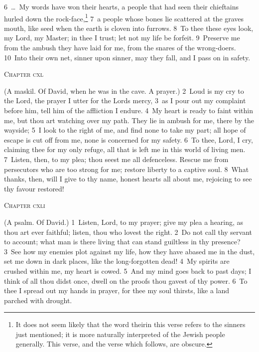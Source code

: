 \documentclass[10pt]{book} %
\begin{document}
\textcolor{benred8}{6}~\ldots\  My words have won their hearts, a people that had seen their chieftains hurled down the rock-face,\footnote[1]{It does not seem likely that the word \textasciigrave their\textquotesingle  in this verse refers to the sinners just mentioned; it is more naturally interpreted of the Jewish people generally. This verse, and the verse which follows, are obscure.} \textcolor{benred8}{7}~a people whose bones lie scattered at the grave\textquotesingle s mouth, like seed when the earth is cloven into furrows.
\textcolor{benred8}{8}~To thee these eyes look, my Lord, my Master; in thee I trust; let not my life be forfeit. \textcolor{benred8}{9}~Preserve me from the ambush they have laid for me, from the snares of the wrong-doers. \textcolor{benred8}{10}~Into their own net, sinner upon sinner, may they fall, and I pass on in safety.
\begin{large}\begin{center}\textsc{Chapter cxl}\end{center}\end{large}
(A maskil. Of David, when he was in the cave. A prayer.)
\textcolor{benred8}{2}~Loud is my cry to the Lord, the prayer I utter for the Lord\textquotesingle s mercy, \textcolor{benred8}{3}~as I pour out my complaint before him, tell him of the affliction I endure. \textcolor{benred8}{4}~My heart is ready to faint within me, but thou art watching over my path. They lie in ambush for me, there by the wayside; \textcolor{benred8}{5}~I look to the right of me, and find none to take my part; all hope of escape is cut off from me, none is concerned for my safety. \textcolor{benred8}{6}~To thee, Lord, I cry, claiming thee for my only refuge, all that is left me in this world of living men. \textcolor{benred8}{7}~Listen, then, to my plea; thou seest me all defenceless. Rescue me from persecutors who are too strong for me; restore liberty to a captive soul. \textcolor{benred8}{8}~What thanks, then, will I give to thy name, honest hearts all about me, rejoicing to see thy favour restored!
\begin{large}\begin{center}\textsc{Chapter cxli}\end{center}\end{large}
(A psalm. Of David.)
\textcolor{benred8}{1}~Listen, Lord, to my prayer; give my plea a hearing, as thou art ever faithful; listen, thou who lovest the right. \textcolor{benred8}{2}~Do not call thy servant to account; what man is there living that can stand guiltless in thy presence? \textcolor{benred8}{3}~See how my enemies plot against my life, how they have abased me in the dust, set me down in dark places, like the long-forgotten dead! \textcolor{benred8}{4}~My spirits are crushed within me, my heart is cowed. \textcolor{benred8}{5}~And my mind goes back to past days; I think of all thou didst once, dwell on the proofs thou gavest of thy power. \textcolor{benred8}{6}~To thee I spread out my hands in prayer, for thee my soul thirsts, like a land parched with drought.
\end{document}
